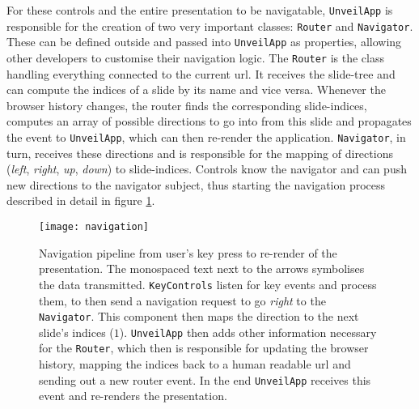 For these controls and the entire presentation to be navigatable, \texttt{Un\-veil\-App} is responsible for the creation of two very important classes: \texttt{Router} and \texttt{Navigator}. These can be defined outside and passed into \texttt{UnveilApp} as properties, allowing other developers to customise their navigation logic.
%
The \texttt{Router} is the class handling everything connected to the current url. It receives the slide-tree and can compute the indices of a slide by its name and vice versa. Whenever the browser history changes, the router finds the corresponding slide-indices, computes an array of possible directions to go into from this slide and propagates the event to \texttt{UnveilApp}, which can then re-render the application.
\texttt{Navigator}, in turn, receives these directions and is responsible for the mapping of directions (\emph{left}, \emph{right}, \emph{up}, \emph{down}) to slide-indices. Controls know the navigator and can push new directions to the navigator subject, thus starting the navigation process described in detail in figure \ref{fig:implementation-technologies-unveil-navigation}.

\begin{figure}
\centering
\texttt{[image: navigation]}
\caption{Navigation pipeline from user's key press to re-render of the presentation. The monospaced text next to the arrows symbolises the data transmitted. \texttt{KeyControls} listen for key events and process them, to then send a navigation request to go \emph{right} to the \texttt{Navigator}. This component then maps the direction to the next slide's indices ($1$). \texttt{UnveilApp} then adds other information necessary for the \texttt{Router}, which then is responsible for updating the browser history, mapping the indices back to a human readable url and sending out a new router event. In the end \texttt{UnveilApp} receives this event and re-renders the presentation.}
\label{fig:implementation-technologies-unveil-navigation}
\end{figure}


